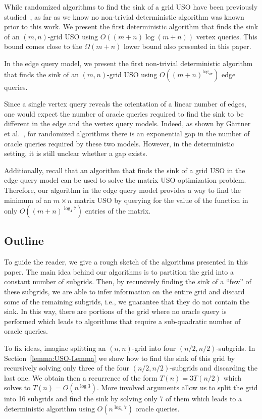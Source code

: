 \documentclass[runningheads,a4paper]{llncs}
\begin{document}
While randomized algorithms to find the sink of a grid USO have been previously studied~\cite{grid05,grid08,linepoint,falkthesis}, as far as we know no non-trivial deterministic algorithm was known prior to this work. 
We present the first deterministic algorithm that finds the sink of an $(m,n)$-grid USO using $O((m+n)\log (m+n))$ vertex queries.
This bound comes close to the $\Omega(m+n)$ lower bound also presented in this paper.

In the edge query model, 
we present the first non-trivial deterministic algorithm that finds the sink of an $(m, n)$-grid USO using $O((m+n)^{\log_47})$ edge queries. 

Since a single vertex query reveals the orientation of a linear number of edges, one would expect the number of  oracle queries required to find the sink to be different in the edge and the vertex query models.
Indeed, as shown by G\"artner et al.~\cite{grid08}, for randomized algorithms there is an exponential gap in the number of oracle queries required by these two models.
However, in the deterministic setting, it is still unclear whether a gap exists.

Additionally, recall that an algorithm that finds the sink of a grid USO in the edge query model can be used to solve the matrix USO optimization problem. 
Therefore, our algorithm in the edge query model provides a way to find the minimum of an $m\times n$ matrix USO by querying for the value of the function in  only $O((m+n)^{\log_4 7})$ entries of the matrix. 

\subsection{Outline}

To guide the reader, we give a rough sketch of the algorithms presented in this paper.
The main idea behind our algorithms is to partition the grid into a constant number of subgrids. 
Then, by recursively finding the sink of a ``few'' of these subgrids, we are able to infer information on the entire grid and discard some of the remaining subgrids, i.e., we guarantee that they do not contain the sink. 
In this way, there are portions of the grid where no oracle query is performed which leads to algorithms that require a sub-quadratic number of oracle queries.

To fix ideas, imagine splitting an $(n,n)$-grid into four $(n/2, n/2)$-subgrids. 
In Section~\ref{lemma:USO-Lemma} we show how to find the sink of this grid by recursively solving only three of the four $(n/2, n/2)$-subgrids and discarding the last one. 
We obtain then a recurrence of the form $T(n) = 3 T(n/2)$ which solves to $T(n) = O(n^{\log 3})$.
More involved arguments allow us to split the grid into 16 subgrids and find the sink by solving only 7 of them which leads to a deterministic algorithm using $O(n^{\log_4 7})$ oracle queries.
\end{document}
